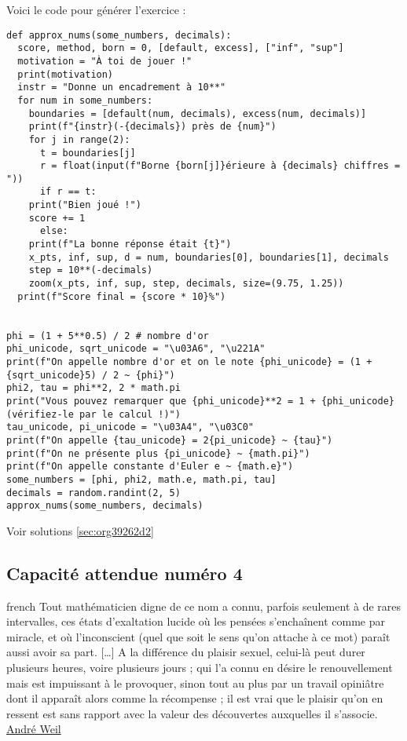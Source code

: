 \documentclass[a4paper, 11pt, twoside]{article}
\begin{document}
Voici le code pour générer l'exercice :
\begin{verbatim}
def approx_nums(some_numbers, decimals):
  score, method, born = 0, [default, excess], ["inf", "sup"]
  motivation = "À toi de jouer !"
  print(motivation)
  instr = "Donne un encadrement à 10**"
  for num in some_numbers:
    boundaries = [default(num, decimals), excess(num, decimals)]
    print(f"{instr}(-{decimals}) près de {num}")
    for j in range(2):
      t = boundaries[j]
      r = float(input(f"Borne {born[j]}érieure à {decimals} chiffres = "))
      if r == t:
	print("Bien joué !")
	score += 1
      else:
	print(f"La bonne réponse était {t}")
    x_pts, inf, sup, d = num, boundaries[0], boundaries[1], decimals
    step = 10**(-decimals)
    zoom(x_pts, inf, sup, step, decimals, size=(9.75, 1.25))
  print(f"Score final = {score * 10}%")


phi = (1 + 5**0.5) / 2 # nombre d'or
phi_unicode, sqrt_unicode = "\u03A6", "\u221A"
print(f"On appelle nombre d'or et on le note {phi_unicode} = (1 + {sqrt_unicode}5) / 2 ~ {phi}")
phi2, tau = phi**2, 2 * math.pi
print("Vous pouvez remarquer que {phi_unicode}**2 = 1 + {phi_unicode} (vérifiez-le par le calcul !)")
tau_unicode, pi_unicode = "\u03A4", "\u03C0"
print(f"On appelle {tau_unicode} = 2{pi_unicode} ~ {tau}")
print(f"On ne présente plus {pi_unicode} ~ {math.pi}")
print(f"On appelle constante d'Euler e ~ {math.e}")
some_numbers = [phi, phi2, math.e, math.pi, tau]
decimals = random.randint(2, 5)
approx_nums(some_numbers, decimals)
\end{verbatim}

Voir solutions \ref{sec:org39262d2}
\stopcontents[level-2]

\subsection{Capacité attendue numéro 4}
\label{sec:orgc5ac9eb}

\begin{foreigndisplayquote}{french}
Tout mathématicien digne de ce nom a connu, parfois seulement à de
rares intervalles, ces états d’exaltation lucide où les pensées
s’enchaînent comme par miracle, et où l’inconscient (quel que soit
le sens qu’on attache à ce mot) paraît aussi avoir sa part. [\ldots{}] A
la différence du plaisir sexuel, celui-là peut durer plusieurs
heures, voire plusieurs jours ; qui l’a connu en désire le
renouvellement mais est impuissant à le provoquer, sinon tout au
plus par un travail opiniâtre dont il apparaît alors comme la
récompense ; il est vrai que le plaisir qu’on en ressent est sans
rapport avec la valeur des découvertes auxquelles il s’associe.\\

\href{https://fr.wikipedia.org/wiki/Andr\%C3\%A9\_Weil}{André Weil}
\end{foreigndisplayquote}
\end{document}
